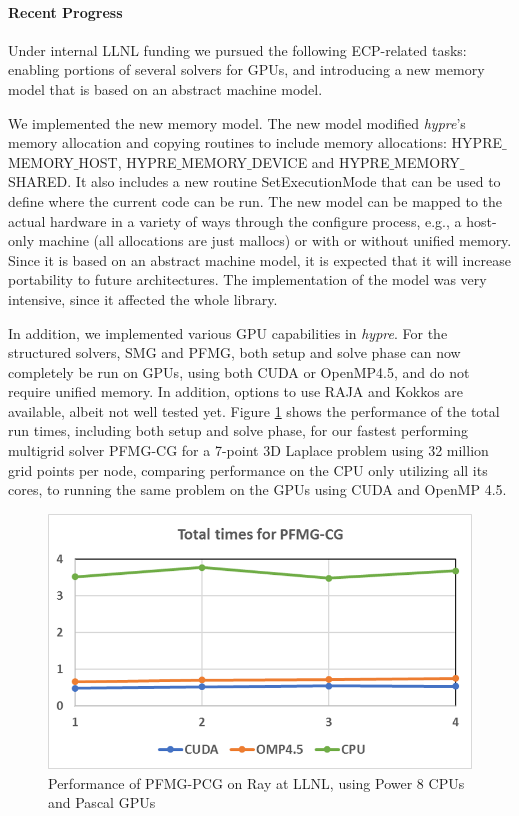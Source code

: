 \paragraph{Recent Progress}

Under internal LLNL funding we pursued the following ECP-related tasks: enabling portions of several solvers for GPUs, and introducing a new memory model that is based on an abstract machine model.

We  implemented the new memory model. The new model modified {\sl hypre}'s memory allocation and copying routines to include memory allocations: HYPRE$\_$MEMORY$\_$HOST, HYPRE$\_$MEMORY$\_$DEVICE and HYPRE$\_$MEMORY$\_$SHARED. It also includes a new routine SetExecutionMode that can be used to define where the current code can be run.
The new model can be mapped to the actual hardware in a variety of ways through the configure process, e.g., a host-only machine (all allocations are just mallocs) or with or without unified memory. Since it is based on an abstract machine model, it is expected that it will increase portability to future architectures. The implementation of the model was very intensive, since it affected the whole library. 

In addition, we implemented various GPU capabilities in {\sl hypre}. For the structured solvers, SMG and PFMG\cite{AsFa1996}, both setup and solve phase can now completely be run on GPUs, using both CUDA or OpenMP4.5, and do not require unified memory. In addition, options to use RAJA and Kokkos are available, albeit not well tested yet. Figure \ref{fig:pfmg} shows the performance of the total run times, including both setup and solve phase, for our fastest performing multigrid solver PFMG-CG for a 7-point 3D Laplace problem using 32 million grid points per node, comparing performance on the CPU only utilizing all its cores, to running the same problem on the GPUs using CUDA and OpenMP 4.5.

\begin{figure}
\centering
\includegraphics[width=5in]{projects/2.3.3-MathLibs/2.3.3.01-xSDK/PFMG-PCG.png}
\caption{\label{fig:pfmg} Performance of PFMG-PCG on Ray at LLNL, using Power 8 CPUs and Pascal GPUs}
\end{figure}

